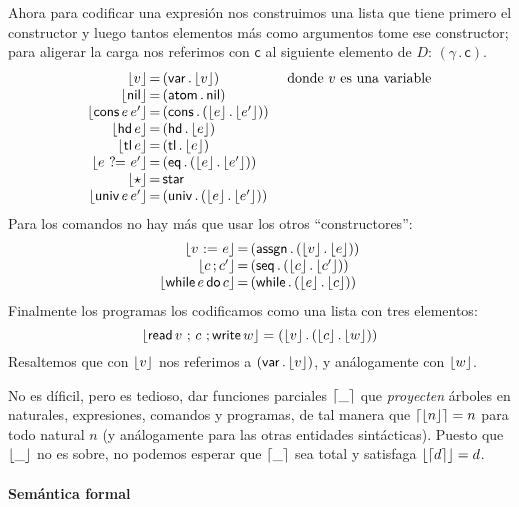 \documentclass[a4paper,twoside,12pt]{article}
\newcommand{\nil}{\mathsf{nil}}
\newcommand{\cons}[2]{(#1\, .\, #2)}
\newcommand{\hd}{\mathsf{hd}}
\newcommand{\tl}{\mathsf{tl}}
\newcommand{\conse}{\mathsf{cons}}
\newcommand{\isEq}{\mathop{?\!\!=}}
\newcommand{\assign}{\mathop{:=}}
\newcommand{\seq}{\mathop{;}}
\newcommand{\whilec}{\mathsf{while}}
\newcommand{\doc}{\mathsf{do}}
\newcommand{\readV}{\mathsf{read}}
\newcommand{\writeV}{\mathsf{write}}
\begin{document}
Ahora para codificar una expresión nos construimos una lista que tiene
primero el constructor y luego tantos elementos más como argumentos
tome ese constructor; para aligerar la carga nos referimos con $\mathsf{c}$ al siguiente elemento de $D$: $\cons{\gamma}{\mathsf{c}}$.
\[
\begin{array}{r@{\,=\,}l@{\quad}l}
  \toD{v} & \cons{\mathsf{var}}{\toD v} & \text{ donde $v$ es una variable} \\
  \toD{\nil} & \cons{\mathsf{atom}}{\nil} & \\
  \toD{\conse\,e\,e'} & \cons{\mathsf{cons}}{\cons{\toD{e}}{\toD{e'}}} & \\
  \toD{\hd\,e} & \cons{\mathsf{hd}}{\toD{e}} & \\
  \toD{\tl\,e} & \cons{\mathsf{tl}}{\toD{e}} & \\
  \toD{e\,\isEq\,e'} & \cons{\mathsf{eq}}{\cons{\toD{e}}{\toD{e'}}} & \\
  \toD{\star} & \mathsf{star} & \\
  \toD{\univ\,e\,e'} & \cons{\mathsf{univ}}{\cons{\toD{e}}{\toD{e'}}} & 
\end{array}
\]
Para los comandos no hay más que usar los otros ``constructores'':
\[
\begin{array}{r@{\,=\,}l}
  \toD{v\,\assign\, e} & \cons{\mathsf{assgn}}{\cons{\toD v}{\toD e}} \\
  \toD{c\seq c'} & \cons{\mathsf{seq}}{\cons{\toD{c}}{\toD{c'}}} \\
  \toD{\whilec\,e\,\doc\,c} & \cons{\mathsf{while}}{\cons{\toD{e}}{\toD c}} 
\end{array}
\]
Finalmente los programas los codificamos como una lista con tres elementos:
\[\toD{\readV\,v\,\seq\, c\,\seq \writeV\, w} = 
  \cons{\toD v}{\cons{\toD c}{\toD w}}
\]
Resaltemos que con $\lfloor v \rfloor$ nos referimos a
$\cons{\mathsf{var}}{\toD v}$, y análogamente con $\lfloor w \rfloor$.

No es díficil, pero es tedioso, dar funciones parciales $\lceil \_ \rceil$ que
\emph{proyecten} árboles en naturales, expresiones, comandos y
programas, de tal manera que $\lceil \lfloor n \rfloor \rceil=n$ para todo natural $n$
(y análogamente para las otras entidades sintácticas). Puesto que
$\lfloor \_ \rfloor$ no es sobre, no podemos esperar que $\lceil \_ \rceil$ sea total y
satisfaga $\lfloor \lceil d \rceil \rfloor=d$.

\paragraph{Semántica formal}
\end{document}
